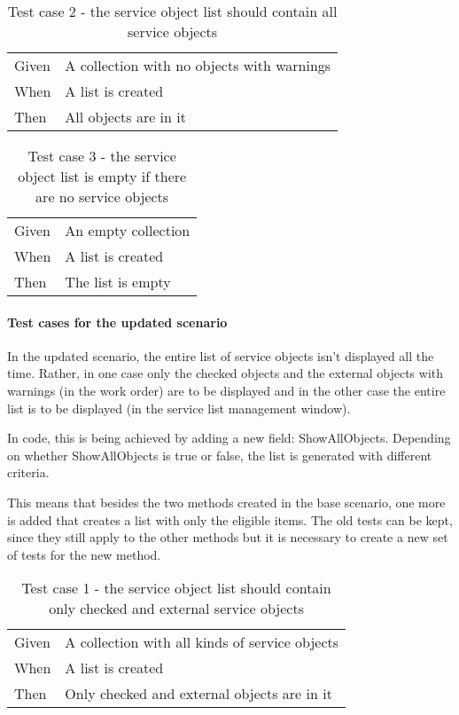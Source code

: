 \documentclass{article}
\begin{document}
				\begin{table}[h!]
					\centering
					\begin{tabular}{|p{1cm} p{7cm} |}
					\hline
					Given 	& A collection with no objects with warnings\\ 
					When 	& A list is created  \\	
					Then 	& All objects are in it \\
					\hline
					\end{tabular}
					\caption{Test case 2 - the service object list should contain all service objects}
				\end{table}


				\begin{table}[h!]
					\centering
					\begin{tabular}{|p{1cm} p{7cm} |}
					\hline
					Given 	& An empty collection \\ 
					When 	& A list is created  \\	
					Then 	& The list is empty \\
					\hline
					\end{tabular}
					\caption{Test case 3 - the service object list is empty if there are no service objects}
				\end{table}

				\paragraph{Test cases for the updated scenario}
				In the updated scenario, the entire list of service objects isn't displayed all the time. Rather, in one case only the checked objects and the external objects with warnings (in the work order) are to be displayed and in the other case the entire list is to be displayed (in the service list management window).

				In code, this is being achieved by adding a new field: ShowAllObjects. Depending on whether ShowAllObjects is true or false, the list is generated with different criteria.
				
				This means that besides the two methods created in the base scenario, one more is added that creates a list with only the eligible items. The old tests can be kept, since they still apply to the other methods but it is necessary to create a new set of tests for the new method.

					\begin{table}[h!]
					\centering
					\begin{tabular}{|p{1cm} p{7cm} |}
					\hline
					Given 	& A collection with all kinds of service objects \\ 
					When 	& A list is created  \\	
					Then 	& Only checked and external objects are in it \\
					\hline
					\end{tabular}
					\caption{Test case 1 - the service object list should contain only checked and external service objects}
				\end{table}
\end{document}
